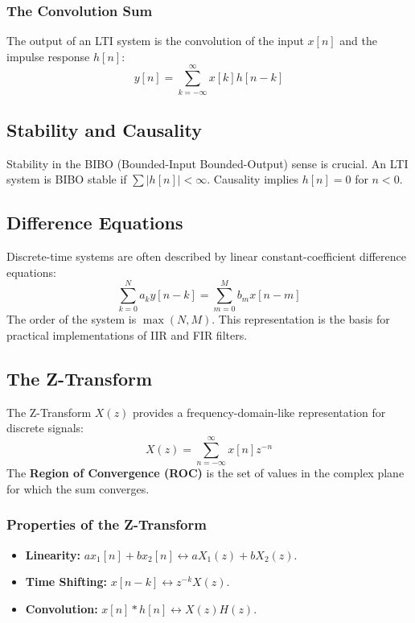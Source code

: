 \subsubsection{The Convolution Sum}
The output of an LTI system is the convolution of the input $x[n]$ and the impulse response $h[n]$:
\begin{equation}
    y[n] = \sum_{k=-\infty}^{\infty} x[k]h[n-k]
\end{equation}

\subsection{Stability and Causality}
Stability in the BIBO (Bounded-Input Bounded-Output) sense is crucial. An LTI system is BIBO stable if $\sum |h[n]| < \infty$. Causality implies $h[n] = 0$ for $n < 0$.

\subsection{Difference Equations}
Discrete-time systems are often described by linear constant-coefficient difference equations:
\begin{equation}
    \sum_{k=0}^{N} a_k y[n-k] = \sum_{m=0}^{M} b_m x[n-m]
\end{equation}
The order of the system is $\max(N, M)$. This representation is the basis for practical implementations of IIR and FIR filters.

\subsection{The Z-Transform}
The Z-Transform $X(z)$ provides a frequency-domain-like representation for discrete signals:
\begin{equation}
    X(z) = \sum_{n=-\infty}^{\infty} x[n]z^{-n}
\end{equation}
The \textbf{Region of Convergence (ROC)} is the set of values in the complex plane for which the sum converges.

\subsubsection{Properties of the Z-Transform}
\begin{itemize}
    \item \textbf{Linearity:} $a x_1[n] + b x_2[n] \leftrightarrow a X_1(z) + b X_2(z)$.
    \item \textbf{Time Shifting:} $x[n-k] \leftrightarrow z^{-k} X(z)$.
    \item \textbf{Convolution:} $x[n] * h[n] \leftrightarrow X(z)H(z)$.
\end{itemize}

